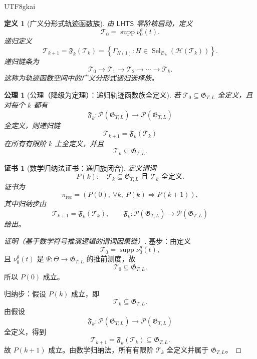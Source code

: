 \documentclass[12pt]{article}
\newtheorem{definition}{定义}[section]
\newtheorem{axiom}{公理}[section]
\newtheorem{Certificate}{证书}[section]
\newcommand{\LHTS}{\ensuremath{\mathsf{LHTS}}}
\DeclareMathOperator{\Sel}{Sel}
\DeclareMathOperator{\supp}{supp}
\begin{document}
\begin{CJK*}{UTF8}{gkai}
\begin{definition}[广义分形式轨迹函数族]
\label{def:tex57-generalized-fractal-family}
由 \(\LHTS{}\) 零阶核启动，定义
\[
  \mathcal T_0=\supp\nu_0^\theta(t).
\]
递归定义
\[
  \boxed{
  \mathcal T_{k+1}
  =
  \mathfrak F_k(\mathcal T_k)
  =
  \left\{
  \Gamma_{H(1)}:
  H\in
  \Sel_{\mathfrak S_k}(\mathcal H(\mathcal T_k))
  \right\}.
  }
\]
递归链条为
\[
  \mathcal T_0
  \to
  \mathcal T_1
  \to
  \mathcal T_2
  \to
  \cdots
  \to
  \mathcal T_k.
\]
这称为轨迹函数空间中的广义分形式递归选择族。
\end{definition}

\begin{axiom}[公理（降级为定理）：递归轨迹函数族全定义]
\label{ax:tex57-recursive-family-well-defined}
若 \(\mathcal T_0\subseteq\mathfrak G_{T,L}\) 全定义，且对每个 \(k\) 都有
\[
  \mathfrak F_k:
  \mathcal P(\mathfrak G_{T,L})
  \to
  \mathcal P(\mathfrak G_{T,L})
\]
全定义，则递归链
\[
  \mathcal T_{k+1}=\mathfrak F_k(\mathcal T_k)
\]
在所有有限阶 \(k\) 上全定义，并且
\[
  \mathcal T_k\subseteq\mathfrak G_{T,L}.
\]
\end{axiom}

\begin{Certificate}[数学归纳法证书：递归族闭合]
\label{cert:tex57-recursive-family-well-defined}
定义谓词
\[
  P(k):\quad
  \mathcal T_k\subseteq\mathfrak G_{T,L}
  \text{ 且 }\mathcal T_k\text{ 全定义}.
\]
证书为
\[
  \pi_{\mathrm{rec}}
  =
  \left(
  P(0),\
  \forall k,\ P(k)\Rightarrow P(k+1)
  \right),
\]
其中归纳步由
\[
  \mathcal T_{k+1}=\mathfrak F_k(\mathcal T_k),
  \qquad
  \mathfrak F_k:
  \mathcal P(\mathfrak G_{T,L})
  \to
  \mathcal P(\mathfrak G_{T,L})
\]
给出。
\end{Certificate}

\begin{proof}[证明（基于数学符号推演逻辑的谓词因果链）]
基步：由定义
\[
  \mathcal T_0=\supp\nu_0^\theta(t),
\]
且 \(\nu_0^\theta(t)\) 是 \(\Psi:\Theta\to\mathfrak G_{T,L}\) 的推前测度，故
\[
  \mathcal T_0\subseteq\mathfrak G_{T,L}.
\]
所以 \(P(0)\) 成立。

归纳步：假设 \(P(k)\) 成立，即
\[
  \mathcal T_k\subseteq\mathfrak G_{T,L}.
\]
由假设
\[
  \mathfrak F_k:
  \mathcal P(\mathfrak G_{T,L})
  \to
  \mathcal P(\mathfrak G_{T,L})
\]
全定义，得到
\[
  \mathcal T_{k+1}
  =
  \mathfrak F_k(\mathcal T_k)
  \subseteq
  \mathfrak G_{T,L}.
\]
故 \(P(k+1)\) 成立。由数学归纳法，所有有限阶 \(\mathcal T_k\) 全定义并属于
\(\mathfrak G_{T,L}\)。
\end{proof}


\end{CJK*}
\end{document}

